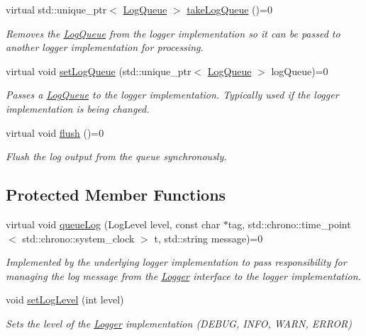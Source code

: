 \begin{DoxyCompactItemize}
virtual std\+::unique\+\_\+ptr$<$ \hyperlink{class_aws_1_1_iot_1_1_device_client_1_1_logging_1_1_log_queue}{Log\+Queue} $>$ \hyperlink{class_aws_1_1_iot_1_1_device_client_1_1_logging_1_1_logger_a39f3326be17f9ed4b1385f057134774d}{take\+Log\+Queue} ()=0
\begin{DoxyCompactList}\small\item\em Removes the \hyperlink{class_aws_1_1_iot_1_1_device_client_1_1_logging_1_1_log_queue}{Log\+Queue} from the logger implementation so it can be passed to another logger implementation for processing. \end{DoxyCompactList}\item 
virtual void \hyperlink{class_aws_1_1_iot_1_1_device_client_1_1_logging_1_1_logger_a6b80ca4200fbc58bb2994ef4319ea822}{set\+Log\+Queue} (std\+::unique\+\_\+ptr$<$ \hyperlink{class_aws_1_1_iot_1_1_device_client_1_1_logging_1_1_log_queue}{Log\+Queue} $>$ log\+Queue)=0
\begin{DoxyCompactList}\small\item\em Passes a \hyperlink{class_aws_1_1_iot_1_1_device_client_1_1_logging_1_1_log_queue}{Log\+Queue} to the logger implementation. Typically used if the logger implementation is being changed. \end{DoxyCompactList}\item 
virtual void \hyperlink{class_aws_1_1_iot_1_1_device_client_1_1_logging_1_1_logger_a4743383e9c69bec10ba970dc4394781e}{flush} ()=0
\begin{DoxyCompactList}\small\item\em Flush the log output from the queue synchronously. \end{DoxyCompactList}\end{DoxyCompactItemize}
\subsection*{Protected Member Functions}
\begin{DoxyCompactItemize}
\item 
virtual void \hyperlink{class_aws_1_1_iot_1_1_device_client_1_1_logging_1_1_logger_a75acdae576e13ddd84bccb70d8fb1fef}{queue\+Log} (Log\+Level level, const char $\ast$tag, std\+::chrono\+::time\+\_\+point$<$ std\+::chrono\+::system\+\_\+clock $>$ t, std\+::string message)=0
\begin{DoxyCompactList}\small\item\em Implemented by the underlying logger implementation to pass responsibility for managing the log message from the \hyperlink{class_aws_1_1_iot_1_1_device_client_1_1_logging_1_1_logger}{Logger} interface to the logger implementation. \end{DoxyCompactList}\item 
void \hyperlink{class_aws_1_1_iot_1_1_device_client_1_1_logging_1_1_logger_a01b35eb1221e3bdcf744da4954f11cb2}{set\+Log\+Level} (int level)
\begin{DoxyCompactList}\small\item\em Sets the level of the \hyperlink{class_aws_1_1_iot_1_1_device_client_1_1_logging_1_1_logger}{Logger} implementation (D\+E\+B\+UG, I\+N\+FO, W\+A\+RN, E\+R\+R\+OR) \end{DoxyCompactList}\end{DoxyCompactItemize}
